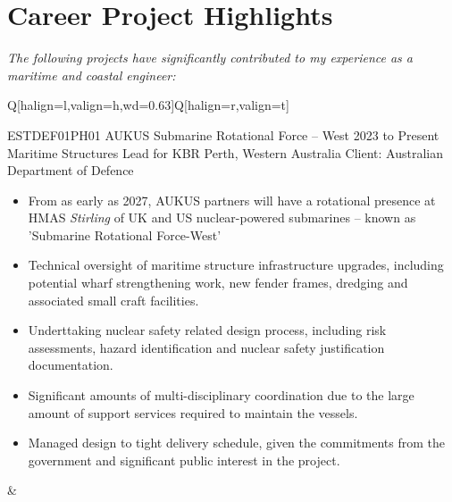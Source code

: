 \section{Career Project Highlights}
\small{\textit{The following projects have significantly contributed to my experience as a maritime and coastal engineer:}}
\renewcommand{\topfraction}{.999}
\renewcommand{\floatpagefraction}{.999}%
\fboxsep=0pt%
\fboxrule=0.5pt%

\FloatBarrier
\begin{table}[h!]
    \begin{tblr}{Q[halign=l,valign=h,wd=0.63\textwidth]Q[halign=r,valign=t]}
    {\entrytableprojecthighlight%
	{ESTDEF01PH01 AUKUS Submarine Rotational Force -- West}
	{2023 to Present}
	{}
	{Maritime Structures Lead for KBR}
	{Perth, Western Australia}
	{Client: Australian Department of Defence}
	{\vspace{1em}\begin{itemize}
		 \item From as early as 2027, AUKUS partners will have a rotational presence at HMAS \textit{Stirling} of UK and US nuclear-powered submarines -- known as 'Submarine Rotational Force-West'
		 \item Technical oversight of maritime structure infrastructure upgrades, including potential wharf strengthening work, new fender frames, dredging and associated small craft facilities. 
		 \item Underttaking nuclear safety related design process, including risk assessments, hazard identification and nuclear safety justification documentation.
		 \item Significant amounts of multi-disciplinary coordination due to the large amount of support services required to maintain the vessels.
		 \item Managed design to tight delivery schedule, given the commitments from the government and significant public interest in the project.
	 \end{itemize}}
	} &  \\

\end{tblr}
\end{table}
